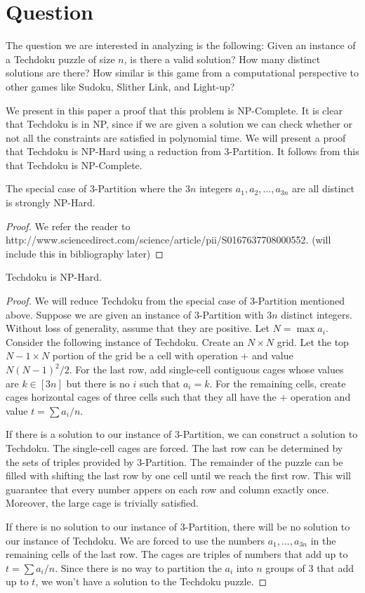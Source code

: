 \documentclass[runningheads,a4paper]{llncs}
\begin{document}
\section{Question}

The question we are interested in analyzing is the following: Given an instance of a Techdoku puzzle of size $n$, is there a valid solution? How many distinct solutions are there? How similar is this game from a computational perspective to other games like Sudoku, Slither Link, and Light-up?

We present in this paper a proof that this problem is NP-Complete. It is clear that Techdoku is in NP, since if we are given a solution we can check whether or not all the constraints are satisfied in polynomial time. We will present a proof that Techdoku is NP-Hard using a reduction from 3-Partition. It follows from this that Techdoku is NP-Complete. 

\begin{lemma}
The special case of 3-Partition where the $3n$ integers $a_1, a_2, ... , a_{3n}$ are all distinct is strongly NP-Hard.
\end{lemma}

\begin{proof}
We refer the reader to http://www.sciencedirect.com/science/article/pii/S0167637708000552. (will include this in bibliography later)
\end{proof}

\begin{theorem} 
Techdoku is NP-Hard.
\end{theorem}

\begin{proof}
We will reduce Techdoku from the special case of 3-Partition mentioned above. Suppose we are given an instance of 3-Partition with $3n$ distinct integers. Without loss of generality, assume that they are positive. Let $N = \max a_i$. Consider the following instance of Techdoku. Create an $N \times N$ grid. Let the top $N-1 \times N$ portion of the grid be a cell with operation $+$ and value $N(N-1)^2/2$. For the last row, add single-cell contiguous cages whose values are $k \in [3n]$ but there is no $i$ such that $a_i = k$. For the remaining cells, create cages horizontal cages of three cells such that they all have the $+$ operation and value $t = \sum a_i /n$.

If there is a solution to our instance of 3-Partition, we can construct a solution to Techdoku. The single-cell cages are forced. The last row can be determined by the sets of triples provided by 3-Partition. The remainder of the puzzle can be filled with shifting the last row by one cell until we reach the first row. This will guarantee that every number appers on each row and column exactly once. Moreover, the large cage is trivially satisfied. 

If there is no solution to our instance of 3-Partition, there will be no solution to our instance of Techdoku. We are forced to use the numbers $a_1, ... ,a_{3n}$ in the remaining cells of the last row. The cages are triples of numbers that add up to $t = \sum a_i/n$. Since there is no way to partition the $a_i$ into $n$ groups of 3 that add up to $t$, we won't have a solution to the Techdoku puzzle. 
\end{proof}
\end{document}
